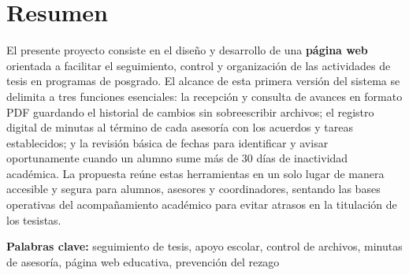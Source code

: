 \section{Resumen}\label{sec:resumen}El presente proyecto consiste en el diseño y desarrollo de una \textbf{página web} orientada a facilitar el seguimiento, control y organización de las actividades de tesis en programas de posgrado. El alcance de esta primera versión del sistema se delimita a tres funciones esenciales: la recepción y consulta de avances en formato PDF guardando el historial de cambios sin sobreescribir archivos; el registro digital de minutas al término de cada asesoría con los acuerdos y tareas establecidos; y la revisión básica de fechas para identificar y avisar oportunamente cuando un alumno sume más de 30 días de inactividad académica. La propuesta reúne estas herramientas en un solo lugar de manera accesible y segura para alumnos, asesores y coordinadores, sentando las bases operativas del acompañamiento académico para evitar atrasos en la titulación de los tesistas.  \vspace{0.5cm}

\noindent \textbf{Palabras clave:} seguimiento de tesis, apoyo escolar, control de archivos, minutas de asesoría, página web educativa, prevención del rezago